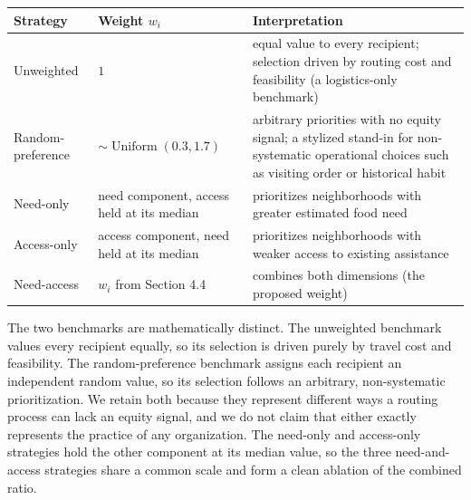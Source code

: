 \documentclass[
  11pt,
]{article}
\newcounter{none} %
\begin{document}
{\def\LTcaptype{none} %
\begin{longtable}[]{@{}
  >{\raggedright\arraybackslash}p{}
  >{\raggedright\arraybackslash}p{}
  >{\raggedright\arraybackslash}p{}@{}}
\toprule\noalign{}
\begin{minipage}[b]{\linewidth}\raggedright
Strategy
\end{minipage} & \begin{minipage}[b]{\linewidth}\raggedright
Weight \(w_i\)
\end{minipage} & \begin{minipage}[b]{\linewidth}\raggedright
Interpretation
\end{minipage} \\
\midrule\noalign{}
\endhead
\bottomrule\noalign{}
\endlastfoot
Unweighted & \(1\) & equal value to every recipient; selection driven by
routing cost and feasibility (a logistics-only benchmark) \\
Random-preference & \(\sim \operatorname{Uniform}(0.3, 1.7)\) &
arbitrary priorities with no equity signal; a stylized stand-in for
non-systematic operational choices such as visiting order or historical
habit \\
Need-only & need component, access held at its median & prioritizes
neighborhoods with greater estimated food need \\
Access-only & access component, need held at its median & prioritizes
neighborhoods with weaker access to existing assistance \\
Need-access & \(w_i\) from Section 4.4 & combines both dimensions (the
proposed weight) \\
\end{longtable}
}

The two benchmarks are mathematically distinct. The unweighted benchmark
values every recipient equally, so its selection is driven purely by
travel cost and feasibility. The random-preference benchmark assigns
each recipient an independent random value, so its selection follows an
arbitrary, non-systematic prioritization. We retain both because they
represent different ways a routing process can lack an equity signal,
and we do not claim that either exactly represents the practice of any
organization. The need-only and access-only strategies hold the other
component at its median value, so the three need-and-access strategies
share a common scale and form a clean ablation of the combined ratio.
\end{document}
